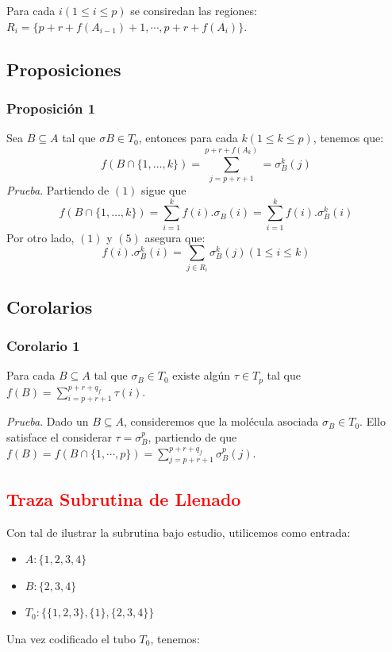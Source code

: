 \documentclass[12pt, letterpaper, twoside]{article}
\begin{document}
    Para cada $i (1\leq i \leq p)$ se consiredan las regiones: $R_i=\{p+r+f(A_{i-1})+1,\cdots,p+r+f(A_i)\}$.


    \subsection{Proposiciones}
    \subsubsection{Proposición 1}
    Sea $B\subseteq{A}$ tal que $\sigma{B}\in{T_0}$, entonces para cada $k(1\leq{k}\leq{p})$, tenemos que:
    \begin{equation*}
        f(B\cap{\{1,\dots,k\}})=\sum^{p+r+f(A_k)}_{j=p+r+1}=\sigma^{k}_{B}(j)
    \end{equation*}
    \emph{Prueba}. Partiendo de $(1)$ sigue que
    \begin{equation*}
        f(B\cap{\{1,\dots,{k}\}})=\sum^{k}_{i=1}f(i).\sigma_{B}(i)=\sum^{k}_{i=1}f(i).\sigma^{k}_{B}(i)
    \end{equation*}
    Por otro lado, $(1)$ y $(5)$ asegura que:
    \begin{equation*}
        f(i).\sigma^{k}_{B}(i)=\sum_{j\in{R_{i}}}\sigma^{k}_{B}(j) (1\leq{i}\leq{k})
    \end{equation*}
    \subsection{Corolarios}
    \subsubsection{Corolario 1}
    Para cada $B\subseteq{A}$ tal que $\sigma_{B}\in{T_0}$ existe algún $\tau\in{T_{p}}$ tal que $f(B)=\sum^{p+r+q_f}_{i=p+r+1}\tau(i)$.

    \emph{Prueba}. Dado un $B\subseteq{A}$, consideremos que la molécula asociada $\sigma_{B}\in{T_0}$. Ello satisface el considerar $\tau=\sigma^{p}_{B}$, partiendo de que $f(B)=f(B\cap{\{1,\cdots,p\}})=\sum^{p+r+q_f}_{j=p+r+1}\sigma^{p}_{B}(j)$. 


   \subsection{\textcolor{red}{Traza Subrutina de Llenado}}
   Con tal de ilustrar la subrutina bajo estudio, utilicemos como entrada:
   \begin{itemize}
       \item $A: \{1, 2, 3, 4\}$
       \item $B: \{2, 3, 4\}$
       \item $T_0: \{\{1,2,3\}, \{1\}, \{2,3,4\}\}$
    \end{itemize}
    Una vez codificado el tubo $T_0$, tenemos:
\end{document}
